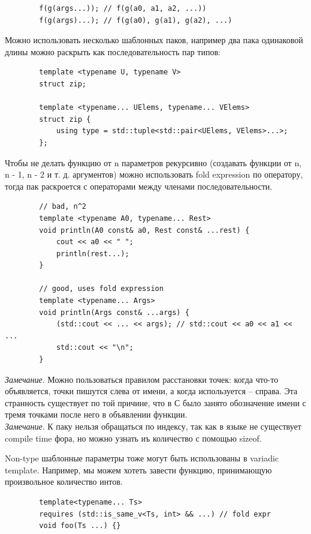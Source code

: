 \documentclass[12pt, a4paper]{article}
\begin{document}
	\begin{verbatim}
		f(g(args...)); // f(g(a0, a1, a2, ...))
		f(g(args)...); // f(g(a0), g(a1), g(a2), ...)
	\end{verbatim}
	Можно использовать несколько шаблонных паков, например два пака одинаковой длины можно раскрыть как последовательность пар типов:
	\begin{verbatim}
		template <typename U, typename V>
		struct zip;
		
		template <typename... UElems, typename... VElems>
		struct zip {
			using type = std::tuple<std::pair<UElems, VElems>...>;
		};
	\end{verbatim}
	Чтобы не делать функцию от n параметров рекурсивно (создавать функции от n, n - 1, n - 2 и т. д. аргументов) можно использовать fold expression по оператору, тогда пак раскроется с операторами между членами последовательности.
	\begin{verbatim}
		// bad, n^2
		template <typename A0, typename... Rest>
		void println(A0 const& a0, Rest const& ...rest) {
			cout << a0 << " ";
			println(rest...);
		}
		
		// good, uses fold expression
		template <typename... Args>
		void println(Args const& ...args) {
			(std::cout << ... << args); // std::cout << a0 << a1 << ...
			std::cout << "\n";
		}
	\end{verbatim}
	\textit{Замечание}. Можно пользоваться правилом расстановки точек: когда что-то объявляется, точки пишутся слева от имени, а когда используется -- справа. Эта странность существует по той причине, что в С было занято обозначение имени с тремя точками после него в объявлении функции.\\
	\textit{Замечание}. К паку нельзя обращаться по индексу, так как в языке не существует compile time фора, но можно узнать иъ количество с помощью sizeof.
	\\\par Non-type шаблонные параметры тоже могут быть использованы в variadic template. Например, мы можем хотеть завести функцию, принимающую произвольное количество интов. 
	\begin{verbatim}
		template<typename... Ts>
		requires (std::is_same_v<Ts, int> && ...) // fold expr
		void foo(Ts ...) {}
	\end{verbatim}
\end{document}
